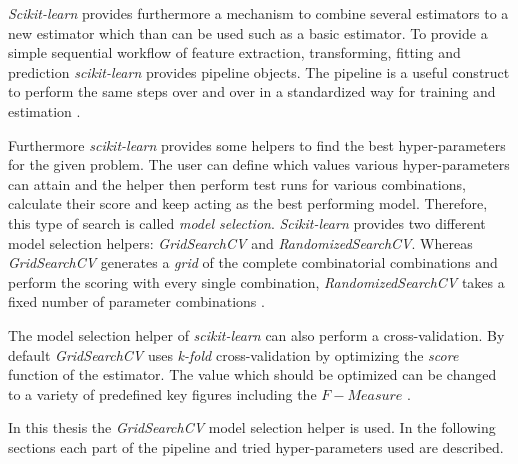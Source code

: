 \emph{Scikit-learn} provides furthermore a mechanism to combine several estimators to a new estimator which than can be used such as a basic estimator.
To provide a simple sequential workflow of feature extraction, transforming, fitting and prediction \emph{scikit-learn} provides pipeline objects.
The pipeline is a useful construct to perform the same steps over and over in a standardized way for training and estimation
\cite{buitinck2013api}.

Furthermore \emph{scikit-learn} provides some helpers to find the best hyper-parameters for the given problem.
The user can define which values various hyper-parameters can attain and the helper then perform test runs for various combinations, calculate their score and keep acting as the best performing model.
Therefore, this type of search is called \emph{model selection}.
\emph{Scikit-learn} provides two different model selection helpers: \emph{GridSearchCV} and \emph{RandomizedSearchCV}.
Whereas \emph{GridSearchCV} generates a \emph{grid} of the complete combinatorial combinations and perform the scoring with every single combination, \emph{RandomizedSearchCV} takes a fixed number of parameter combinations
\cite{buitinck2013api}.

The model selection helper of \emph{scikit-learn} can also perform a cross-validation.
By default \emph{GridSearchCV} uses \emph{k-fold} cross-validation by optimizing the \emph{score} function of the estimator.
The value which should be optimized can be changed to a variety of predefined key figures including the $F-Measure$
\cite{buitinck2013api}.

In this thesis the \emph{GridSearchCV} model selection helper is used. 
In the following sections each part of the pipeline and tried hyper-parameters used are described.

